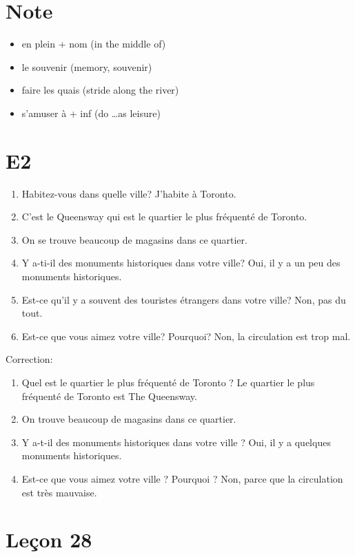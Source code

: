 \documentclass{book}
\begin{document}
    \section{Note}
        \begin{itemize}
            \item en plein + nom (in the middle of)
            \item le souvenir (memory, souvenir)
            \item faire les quais (stride along the river)
            \item s'amuser à + inf (do \dots as leisure)
        \end{itemize}

    \section{E2}
        \begin{enumerate}
            \item Habitez-vous dans quelle ville? J'habite à Toronto.
            \item C'est le Queensway qui est le quartier le plus fréquenté de Toronto.
            \item On se trouve beaucoup de magasins dans ce quartier.
            \item Y a-ti-il des monuments historiques dans votre ville? Oui, il y a un peu des monuments historiques.
            \item Est-ce qu'il y a souvent des touristes étrangers dans votre ville? Non, pas du tout.
            \item Est-ce que vous aimez votre ville? Pourquoi? Non, la circulation est trop mal.
        \end{enumerate}
        Correction:
        \begin{enumerate}
            \item Quel est le quartier le plus fréquenté de Toronto ? Le quartier le plus fréquenté de Toronto est The Queensway.
            \item On trouve beaucoup de magasins dans ce quartier.
            \item Y a-t-il des monuments historiques dans votre ville ? Oui, il y a quelques monuments historiques.
            \item Est-ce que vous aimez votre ville ? Pourquoi ? Non, parce que la circulation est très mauvaise.
        \end{enumerate}

\section{Leçon 28}
\end{document}
